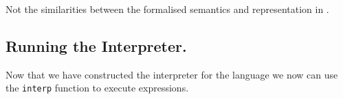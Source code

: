 \noindent
Not the similarities between the formalised semantics and representation in \idris{}.

\subsection{Running the Interpreter.}
\label{sec:running-interpreter}

Now that we have constructed the interpreter for the language we now can use the \texttt{interp} function to execute expressions.


